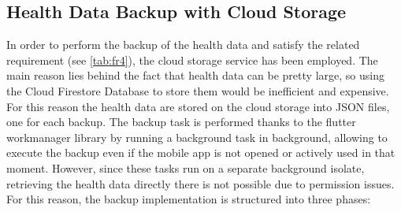 \subsection{Health Data Backup with Cloud Storage}
\label{subsec:backup}
In order to perform the backup of the health data and satisfy the related requirement (see \cref{tab:fr4}), the cloud storage service has been employed. The main reason lies behind the fact that health data can be pretty large, so using the Cloud Firestore Database to store them would be inefficient and expensive. For this reason the health data are stored on the cloud storage into JSON files, one for each backup. The backup task is performed thanks to the flutter workmanager library by running a background task in background, allowing to execute the backup even if the mobile app is not opened or actively used in that moment. However, since these tasks run on a separate background isolate, retrieving the health data directly there is not possible due to permission issues.
\noindent For this reason, the backup implementation is structured into three phases:
